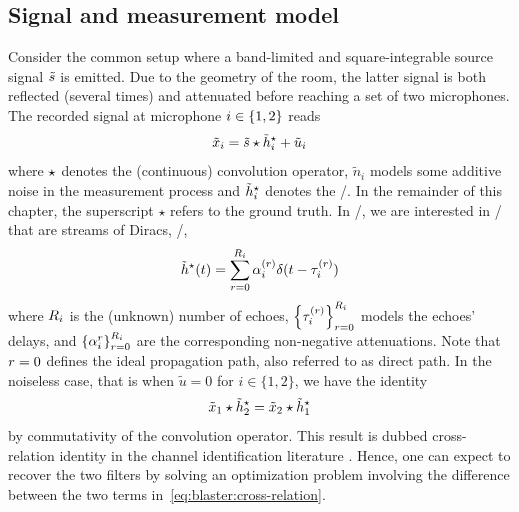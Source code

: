 \subsection{Signal and measurement model}
Consider the common setup where a band-limited and square-integrable source signal $\tilde{s}$ is emitted.
Due to the geometry of the room, the latter signal is both reflected (several times) and attenuated before reaching a set of two microphones.
The recorded signal at microphone $i\in\{1,2\}$ reads
\begin{equation}
    \label{eq:blaster:recordedSignal}
    \tilde{x}_i = \tilde{s} \star \tilde{h}_i^\star + \tilde{u}_i
\end{equation}
where $\star$ denotes the (continuous) convolution operator, $\tilde{n}_i$ models some additive noise in the measurement process and $\tilde{h}_i^\star$ denotes the \RIRdef/.
In the remainder of this chapter, the superscript $\star$ refers to the ground truth.
In \AER/, we are interested in \RIRs/ that are streams of Diracs, \ie/,
\begin{equation}
    \label{eq:blaster:def_filter_star}
    \tilde{h}^\star(t) = \sum_{r=0}^{R_i} \alpha_i^{(r)} \delta(t - \tau_i^{(r)})
\end{equation}
where $R_i$ is the (unknown) number of echoes, $\kfamily{\tau_{i}^{(r)}}{\idxEch=0}^{\numEchs_i}$ models the echoes' delays, and $\kfamily{\alpha_{i}^{\idxEch}}{\idxEch=0}^{\numEchs_i}$ are the corresponding non-negative attenuations.
Note that $r=0$ defines the ideal propagation path, also referred to as direct path.
%
In the noiseless case, that is when $\tilde{u} = 0$ for $i\in\{1,2\}$, we have the identity
\begin{equation} \label{eq:blaster:cross-relation}
    \tilde{x}_1 \star \tilde{h}_2^\star = \tilde{x}_2 \star \tilde{h}_1^\star
\end{equation}
by commutativity of the convolution operator.
This result is dubbed cross-relation identity in the channel identification literature .
Hence, one can expect to recover the two filters by solving an optimization problem involving the difference between the two terms in~\cref{eq:blaster:cross-relation}.

